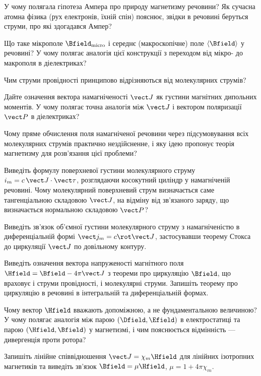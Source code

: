 \begin{Questions}
\begin{quizlist}
	\item У чому полягала гіпотеза Ампера про природу магнетизму речовини? Як сучасна атомна фізика (рух електронів, їхній спін) пояснює, звідки в речовині беруться струми, про які здогадався Ампер?
	\item Що таке мікрополе $\Bfield_\text{micro}$ і середнє (макроскопічне) поле $\langle\Bfield\rangle$ у речовині? У чому полягає аналогія цієї конструкції з переходом від мікро- до макрополя в діелектриках?
	\item Чим струми провідності принципово відрізняються від молекулярних струмів?
	\item Дайте означення вектора намагніченості $\vect J$ як густини магнітних дипольних моментів. У чому полягає точна аналогія між $\vect J$ і вектором поляризації $\vect P$ в діелектриках?
	\item Чому пряме обчислення поля намагніченої речовини через підсумовування всіх молекулярних струмів практично нездійсненне, і яку ідею пропонує теорія магнетизму для розв'язання цієї проблеми?
	\item Виведіть формулу поверхневої густини молекулярного струму $i_m = c\,\vect J\cdot\vect\tau$, розглядаючи косокутний циліндр у намагніченій речовині. Чому молекулярний поверхневий струм визначається саме тангенціальною складовою $\vect J$, на відміну від зв'язаного заряду, що визначається нормальною складовою $\vect P$?
	\item Виведіть зв'язок об'ємної густини молекулярного струму з намагніченістю в диференціальній формі $\vect j_m = c\rot\vect J$, застосувавши теорему Стокса до циркуляції $\vect J$ по довільному контуру.
	\item Виведіть означення вектора напруженості магнітного поля $\Hfield = \Bfield - 4\pi\vect J$ з теореми про циркуляцію $\Bfield$, що враховує і струми провідності, і молекулярні струми. Запишіть теорему про циркуляцію в речовині в інтегральній та диференціальній формах.
	\item Чому вектор $\Hfield$ вважають допоміжною, а не фундаментальною величиною? У чому полягає аналогія між парою $(\Dfield,\Efield)$ в електростатиці та парою $(\Hfield,\Bfield)$ у магнетизмі, і чим пояснюється відмінність --- дивергенція проти ротора?
	\item Запишіть лінійне співвідношення $\vect J = \chi_m\Hfield$ для лінійних ізотропних магнетиків та виведіть зв'язок $\Bfield=\mu\Hfield$, $\mu=1+4\pi\chi_m$.

\end{quizlist}
\end{Questions}
